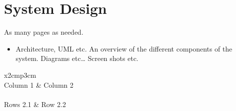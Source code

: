
\chapter{System Design}










As many pages as needed.
\begin{itemize}
\item Architecture, UML etc. An overview of the different components of the system. Diagrams etc… Screen shots etc.
\end{itemize}

\begin{table}[h]
  \centering
  \begin{tabular}{x{2cm}p{3cm}}
    \toprule \\
    Column 1 & Column 2 \\
    \midrule \\
    Rows 2.1 & Row 2.2 \\
    \bottomrule
  \end{tabular}
  \caption{A table.}
  \label{table:mytable}
\end{table}